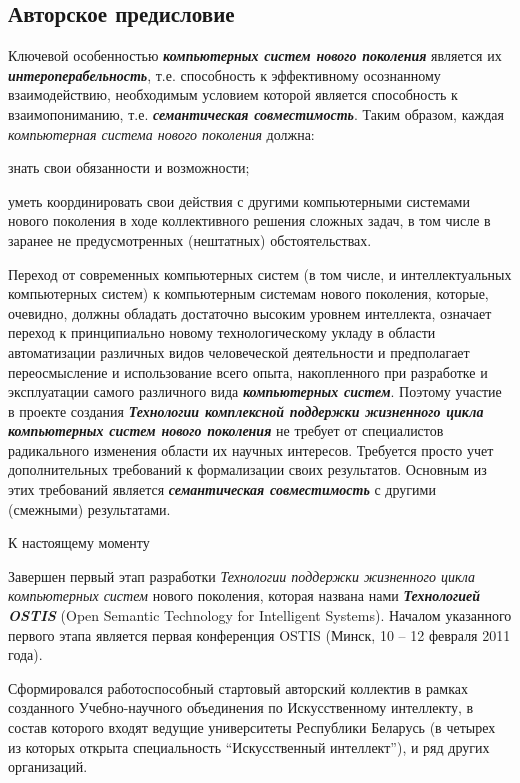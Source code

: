 \begin{partbacktext}
\part*{Авторское предисловие}
\label{chap_preface_auth}

Ключевой особенностью \textbf{\textit{компьютерных систем нового поколения}} является их \textbf{\textit{интероперабельность}}, т.е. способность к эффективному осознанному взаимодействию, необходимым условием которой является способность к взаимопониманию, т.е. \textbf{\textit{семантическая совместимость}}. Таким образом, каждая \textit{компьютерная система нового поколения} должна:

\begin{textitemize}
	\item знать свои обязанности и возможности;
	\item уметь координировать свои действия с другими компьютерными системами нового поколения в ходе коллективного решения сложных задач, в том числе в заранее не предусмотренных (нештатных) обстоятельствах.
\end{textitemize}

Переход от современных компьютерных систем (в том числе, и интеллектуальных компьютерных систем) к компьютерным системам нового поколения, которые, очевидно, должны обладать достаточно высоким уровнем интеллекта, означает переход к принципиально новому технологическому укладу в области автоматизации различных видов человеческой деятельности и предполагает переосмысление и использование всего опыта, накопленного при разработке и эксплуатации самого различного вида \textbf{\textit{компьютерных систем}}. Поэтому участие в проекте создания \textbf{\textit{Технологии комплексной поддержки жизненного цикла компьютерных систем нового поколения}} не требует от специалистов радикального изменения области их научных интересов. Требуется просто учет дополнительных требований к формализации своих результатов. Основным из этих требований является \textbf{\textit{семантическая совместимость}} с другими (смежными) результатами.

К настоящему моменту 
\begin{textitemize}
	\item Завершен первый этап разработки \textit{Технологии поддержки жизненного цикла компьютерных систем} нового поколения, которая названа нами \textbf{\textit{Технологией OSTIS}} (Open Semantic Technology for Intelligent Systems). Началом указанного первого этапа является первая конференция OSTIS (Минск, 10 -- 12 февраля 2011 года).
	\item Сформировался работоспособный стартовый авторский коллектив в рамках созданного Учебно-научного объединения по Искусственному интеллекту, в состав которого входят ведущие университеты Республики Беларусь (в четырех из которых открыта специальность ``Искусственный интеллект''), и ряд других организаций.
\end{textitemize}



\end{partbacktext}
